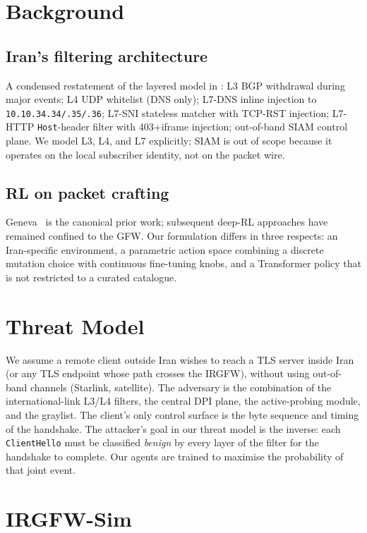 \documentclass[letterpaper,twocolumn,10pt]{article}
\begin{document}
\section{Background}
\label{sec:background}

\subsection{Iran's filtering architecture}
A condensed restatement of the layered model in
\cite{aryapour2025,nym2025}: L3 BGP withdrawal during major events;
L4 UDP whitelist (DNS only); L7-DNS inline injection to
\texttt{10.10.34.34/.35/.36}; L7-SNI stateless matcher with TCP-RST
injection; L7-HTTP \texttt{Host}-header filter with 403+iframe injection;
out-of-band SIAM control plane. We model L3, L4, and L7 explicitly; SIAM
is out of scope because it operates on the local subscriber identity, not
on the packet wire.

\subsection{RL on packet crafting}
Geneva~\cite{bock2019geneva} is the canonical prior work; subsequent
deep-RL approaches have remained confined to the GFW. Our
formulation differs in three respects: an Iran-specific environment, a
parametric action space combining a discrete mutation choice with
continuous fine-tuning knobs, and a Transformer policy that is not
restricted to a curated catalogue.

\section{Threat Model}
\label{sec:threatmodel}
We assume a remote client outside Iran wishes to reach a TLS server inside
Iran (or any TLS endpoint whose path crosses the IRGFW), without using
out-of-band channels (Starlink, satellite). The adversary is the
combination of the international-link L3/L4 filters, the central DPI
plane, the active-probing module, and the graylist. The client's only
control surface is the byte sequence and timing of the handshake. The
attacker's goal in our threat model is the inverse: each \texttt{ClientHello}
must be classified \emph{benign} by every layer of the filter for the
handshake to complete. Our agents are trained to maximise the probability
of that joint event.

\section{IRGFW-Sim}
\label{sec:sim}
\end{document}
